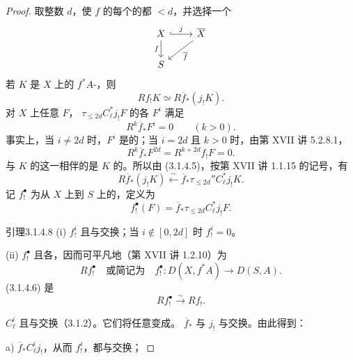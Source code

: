 \begin{proof}
取整数 $d$，使 $f$ 的每个的都 $<d$，并选择一个
\[
\begin{tikzcd}
 X\arrow[r,hook,"j"]\arrow[d,"f"'] &\overline X\arrow[dl,"\overline f"]\\ S &
\end{tikzcd}
\]
若 $K$ 是 $X$ 上的 $f^*A$-，则
\[
 Rf_!K\simeq R\overline f_*(j_!K).
\]
对 $X$ 上任意 $F$， $\tau_{\leq2d}C^*_{\ell}j_!F$ 的各 $F^i$ 满足
\[
 R^k\overline f_*F^i=0\qquad(k>0).\tag{3.1.4.5}
\]
事实上，当 $i\ne2d$ 时，$F^i$ 是的；当 $i=2d$ 且 $k>0$ 时，由第 XVII 讲 5.2.8.1，
\[
 R^k\overline f_*F^{2d}=R^{k+2d}f_!F=0.
\]
与 $K$ 的这一相伴的是 $K$ 的。所以由 (3.1.4.5)，按第 XVII 讲 1.1.15 的记号，有
\[
 R\overline f_*(j_!K)\xleftarrow{\sim}\overline f_*\tau_{\leq2d}''C^*_{\ell}j_!K.\tag{3.1.4.6}
\]
记 $f_!^\bullet$ 为从 $X$ 上到 $S$ 上的，定义为
\[
 f_!^\bullet(F)=\overline f_*\tau_{\leq2d}C^*_{\ell}j_!F.\tag{3.1.4.7}
\]
\begin{SGAresult}{引理}{3.1.4.8}
(i)  $f_!^i$ 且与交换；当 $i\notin[0,2d]$ 时 $f_!^i=0$。

(ii)  $f_!^\bullet$ 且各，因而可平凡地（第 XVII 讲 1.2.10）为
\[
 Rf_!^\bullet\quad\text{或简记为}\quad f_!^\bullet\colon D(X,f^*A)\to D(S,A).
\]
 (3.1.4.6) 是
\[
 Rf_!^\bullet\xrightarrow{\sim}Rf_!.
\]
\end{SGAresult}
 $C^i_{\ell}$ 且与交换（3.1.2）。它们将任意变成。 $\overline f_*$ 与 $j_!$ 与交换。由此得到：

a)  $\overline f_*C^i_{\ell}j_!$，从而 $f_!^i$，都与交换；


\end{proof}
